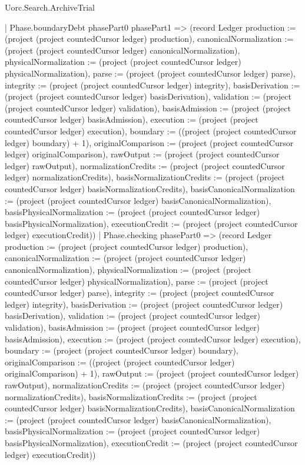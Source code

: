 \begin{lexlean}{Uorc.Search.ArchiveTrial}
\begin{semanticmodule}
{{    | Phase.boundaryDebt phasePart0 phasePart1 => (record Ledger {production := (project (project countedCursor ledger) production), canonicalNormalization := (project (project countedCursor ledger) canonicalNormalization), physicalNormalization := (project (project countedCursor ledger) physicalNormalization), parse := (project (project countedCursor ledger) parse), integrity := (project (project countedCursor ledger) integrity), basisDerivation := (project (project countedCursor ledger) basisDerivation), validation := (project (project countedCursor ledger) validation), basisAdmission := (project (project countedCursor ledger) basisAdmission), execution := (project (project countedCursor ledger) execution), boundary := ((project (project countedCursor ledger) boundary) + 1), originalComparison := (project (project countedCursor ledger) originalComparison), rawOutput := (project (project countedCursor ledger) rawOutput), normalizationCredits := (project (project countedCursor ledger) normalizationCredits), basisNormalizationCredits := (project (project countedCursor ledger) basisNormalizationCredits), basisCanonicalNormalization := (project (project countedCursor ledger) basisCanonicalNormalization), basisPhysicalNormalization := (project (project countedCursor ledger) basisPhysicalNormalization), executionCredit := (project (project countedCursor ledger) executionCredit)})
    | Phase.checking phasePart0 => (record Ledger {production := (project (project countedCursor ledger) production), canonicalNormalization := (project (project countedCursor ledger) canonicalNormalization), physicalNormalization := (project (project countedCursor ledger) physicalNormalization), parse := (project (project countedCursor ledger) parse), integrity := (project (project countedCursor ledger) integrity), basisDerivation := (project (project countedCursor ledger) basisDerivation), validation := (project (project countedCursor ledger) validation), basisAdmission := (project (project countedCursor ledger) basisAdmission), execution := (project (project countedCursor ledger) execution), boundary := (project (project countedCursor ledger) boundary), originalComparison := ((project (project countedCursor ledger) originalComparison) + 1), rawOutput := (project (project countedCursor ledger) rawOutput), normalizationCredits := (project (project countedCursor ledger) normalizationCredits), basisNormalizationCredits := (project (project countedCursor ledger) basisNormalizationCredits), basisCanonicalNormalization := (project (project countedCursor ledger) basisCanonicalNormalization), basisPhysicalNormalization := (project (project countedCursor ledger) basisPhysicalNormalization), executionCredit := (project (project countedCursor ledger) executionCredit)})
}}
\end{semanticmodule}
\end{lexlean}
